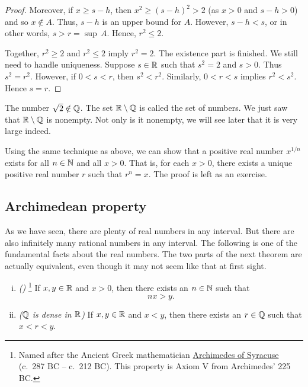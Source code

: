 \begin{example}
\begin{proof}
Moreover, if $x \geq s-h$,
then $x^2 \geq {(s-h)}^2 > 2$ (as $x > 0$ and $s-h > 0$) and so $x \notin A$.
Thus,
$s-h$ is an upper bound for $A$.  However, $s-h < s$,  or in other
words, $s > r = \sup\, A$.  Hence, $r^2 \leq 2$.

\medskip

Together, $r^2 \geq 2$ and $r^2 \leq 2$ imply
$r^2 = 2$.  The existence part is finished.  We still need to
handle uniqueness.  Suppose $s \in {\mathbb{R}}$ such that $s^2 = 2$ and $s > 0$.
Thus $s^2 = r^2$.  However, if $0 < s < r$, then $s^2 < r^2$.  Similarly,
$0 < r < s$ implies $r^2 < s^2$.  Hence $s = r$.
\end{proof}
\end{example}

The number $\sqrt{2} \notin {\mathbb{Q}}$.  The set
${\mathbb{R}} \setminus {\mathbb{Q}}$ is called the set of
\emph{} numbers.  We just saw that ${\mathbb{R}} \setminus {\mathbb{Q}}$
is nonempty.  Not only is it nonempty, we will see later that it is very
large indeed.

Using the same technique as above, we can show that a positive real
number $x^{1/n}$ exists for all $n\in {\mathbb{N}}$ and all $x > 0$.
That is, for each $x > 0$,
there exists a unique positive real number $r$ such that $r^n = x$.
The proof is left as an exercise.

\subsection{Archimedean property}

As we have seen, there are plenty of real numbers in any interval.  But
there are also infinitely many rational numbers in any interval.  The
following is one of the fundamental facts about the real numbers.
The two parts of the next theorem are actually equivalent, even though it may
not seem like that at first sight.


\pagebreak[3]
\begin{thm} \label{thm:arch}
\leavevmode
\begin{enumerate}[(i)]
\item \label{thm:arch:i} \emph{()}%
\footnote{Named after the Ancient Greek mathematician
\href{https://en.wikipedia.org/wiki/Archimedes}{Archimedes of Syracuse}
(c.\ 287 BC -- c.\ 212 BC)\@.
This property is Axiom V from Archimedes'  225
BC\@.}
If $x, y \in {\mathbb{R}}$ and
$x > 0$, then there exists an $n \in {\mathbb{N}}$ such that
\begin{equation*}
nx > y .
\end{equation*}
\item \label{thm:arch:ii} \emph{(${\mathbb{Q}}$ is dense in ${\mathbb{R}}$)} If $x, y \in {\mathbb{R}}$ and
$x < y$, then there exists an $r \in {\mathbb{Q}}$ such that
$x < r < y$.
\end{enumerate}
\end{thm}

